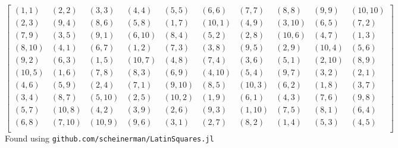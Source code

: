\documentclass[12pt]{article}
\begin{document}
\[
\left[
\begin{array}{cccccccccc}
(1, 1) & (2, 2) & (3, 3) & (4, 4) & (5, 5) & (6, 6) & (7, 7) & (8, 8) & (9, 9) & (10, 10) \\
(2, 3) & (9, 4) & (8, 6) & (5, 8) & (1, 7) & (10, 1) & (4, 9) & (3, 10) & (6, 5) & (7, 2) \\
(7, 9) & (3, 5) & (9, 1) & (6, 10) & (8, 4) & (5, 2) & (2, 8) & (10, 6) & (4, 7) & (1, 3) \\
(8, 10) & (4, 1) & (6, 7) & (1, 2) & (7, 3) & (3, 8) & (9, 5) & (2, 9) & (10, 4) & (5, 6) \\
(9, 2) & (6, 3) & (1, 5) & (10, 7) & (4, 8) & (7, 4) & (3, 6) & (5, 1) & (2, 10) & (8, 9) \\
(10, 5) & (1, 6) & (7, 8) & (8, 3) & (6, 9) & (4, 10) & (5, 4) & (9, 7) & (3, 2) & (2, 1) \\
(4, 6) & (5, 9) & (2, 4) & (7, 1) & (9, 10) & (8, 5) & (10, 3) & (6, 2) & (1, 8) & (3, 7) \\
(3, 4) & (8, 7) & (5, 10) & (2, 5) & (10, 2) & (1, 9) & (6, 1) & (4, 3) & (7, 6) & (9, 8) \\
(5, 7) & (10, 8) & (4, 2) & (3, 9) & (2, 6) & (9, 3) & (1, 10) & (7, 5) & (8, 1) & (6, 4) \\
(6, 8) & (7, 10) & (10, 9) & (9, 6) & (3, 1) & (2, 7) & (8, 2) & (1, 4) & (5, 3) & (4, 5) \\
\end{array}
\right]
\]
\vskip0.5in
\small
Found using \texttt{github.com/scheinerman/LatinSquares.jl}
\end{document}
